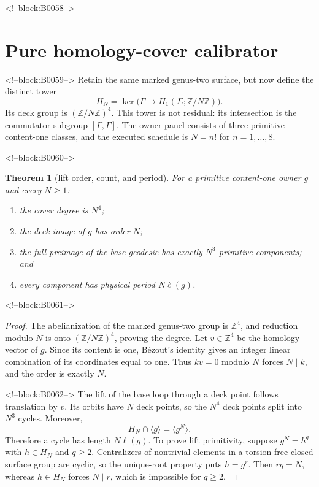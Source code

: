 \documentclass[11pt]{article}
\newtheorem{theorem}{Theorem}[section]
\theoremstyle{definition}
\theoremstyle{remark}
\newcommand{\ZZ}{\mathbb Z}
\begin{document}
<!--block:B0058-->
\section{Pure homology-cover calibrator}

<!--block:B0059-->
Retain the same marked genus-two surface, but now define the distinct tower
\[
H_N=\ker\bigl(\Gamma\to H_1(\Sigma;\ZZ/N\ZZ)\bigr).
\]
Its deck group is $(\ZZ/N\ZZ)^4$. This tower is not residual: its intersection is the commutator subgroup $[\Gamma,\Gamma]$. The owner panel consists of three primitive content-one classes, and the executed schedule is $N=n!$ for $n=1,\ldots,8$.

<!--block:B0060-->
\begin{theorem}[lift order, count, and period]\label{thm:lifts}
For a primitive content-one owner $g$ and every $N\geq1$:
\begin{enumerate}[label=(\roman*)]
\item the cover degree is $N^4$;
\item the deck image of $g$ has order $N$;
\item the full preimage of the base geodesic has exactly $N^3$ primitive components; and
\item every component has physical period $N\ell(g)$.
\end{enumerate}
\end{theorem}

<!--block:B0061-->
\begin{proof}
The abelianization of the marked genus-two group is $\ZZ^4$, and reduction modulo $N$ is onto $(\ZZ/N\ZZ)^4$, proving the degree. Let $v\in\ZZ^4$ be the homology vector of $g$. Since its content is one, B\'ezout's identity gives an integer linear combination of its coordinates equal to one. Thus $kv=0$ modulo $N$ forces $N\mid k$, and the order is exactly $N$.

<!--block:B0062-->
The lift of the base loop through a deck point follows translation by $v$. Its orbits have $N$ deck points, so the $N^4$ deck points split into $N^3$ cycles. Moreover,
\[
H_N\cap\langle g\rangle=\langle g^N\rangle.
\]
Therefore a cycle has length $N\ell(g)$. To prove lift primitivity, suppose $g^N=h^q$ with $h\in H_N$ and $q\geq2$. Centralizers of nontrivial elements in a torsion-free closed surface group are cyclic, so the unique-root property puts $h=g^r$. Then $rq=N$, whereas $h\in H_N$ forces $N\mid r$, which is impossible for $q\geq2$.
\end{proof}
\end{document}
